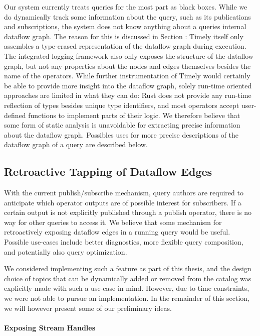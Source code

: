 Our system currently treats queries for the most part as black boxes. While we
do dynamically track some information about the query, such as its publications
and subscriptions, the system does not know anything about a queries internal
dataflow graph. The reason for this is discussed in Section :
Timely itself only assembles a type-erased representation of the dataflow graph
during execution. The integrated logging framework also only exposes the
structure of the dataflow graph, but not any properties about the nodes and
edges themselves besides the name of the operators. While further instrumentation
of Timely would certainly be able to provide more insight into the dataflow
graph, solely run-time oriented approaches are limited in what they can do:
Rust does not provide any run-time reflection of types besides unique type
identifiers, and most operators accept user-defined functions to implement
parts of their logic. We therefore believe that some form of static analysis
is unavoidable for extracting precise information about the dataflow graph.
Possibles uses for more precise descriptions of the dataflow graph of a query
are described below.

\subsection{Retroactive Tapping of Dataflow Edges}

With the current publish/subscribe mechanism, query authors are required to
anticipate which operator outputs are of possible interest for subscribers. If
a certain output is not explicitly published through a publish operator, there
is no way for other queries to access it. We believe that some mechanism
for retroactively exposing dataflow edges in a running query would be useful.
Possible use-cases include better diagnostics, more flexible query composition,
and potentially also query optimization.

We considered implementing such a feature as part
of this thesis, and the design choice of topics that can be dynamically added
or removed from the catalog was  explicitly made with such a use-case in mind.
However, due to time constraints, we were not able to pursue an implementation.
In the remainder of this section, we will however present some of our
preliminary ideas.

\paragraph{Exposing Stream Handles}

